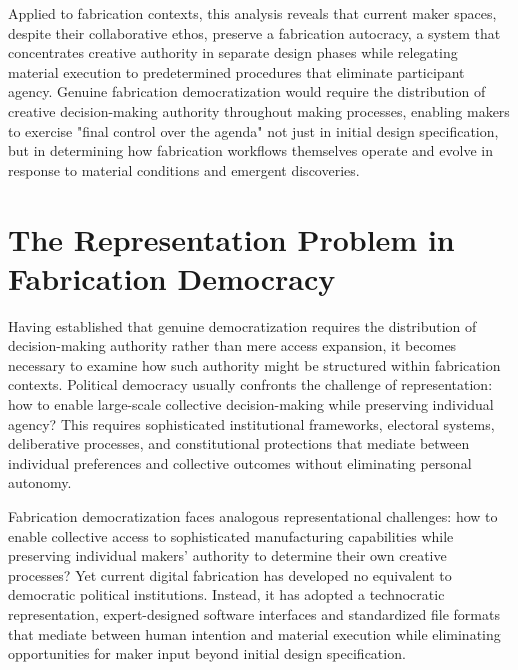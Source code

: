 \vspace{0.5cm}

Applied to fabrication contexts, this analysis reveals that current maker spaces, despite their collaborative ethos, preserve a fabrication autocracy, a system that concentrates creative authority in separate design phases while relegating material execution to predetermined procedures that eliminate participant agency. Genuine fabrication democratization would require the distribution of creative decision-making authority throughout making processes, enabling makers to exercise "final control over the agenda" not just in initial design specification, but in determining how fabrication workflows themselves operate and evolve in response to material conditions and emergent discoveries.

\section{The Representation Problem in Fabrication Democracy}

Having established that genuine democratization requires the distribution of decision-making authority rather than mere access expansion, it becomes necessary to examine how such authority might be structured within fabrication contexts. Political democracy usually confronts the challenge of representation: how to enable large-scale collective decision-making while preserving individual agency? This requires sophisticated institutional frameworks, electoral systems, deliberative processes, and constitutional protections that mediate between individual preferences and collective outcomes without eliminating personal autonomy.

\vspace{0.5cm}

Fabrication democratization faces analogous representational challenges: how to enable collective access to sophisticated manufacturing capabilities while preserving individual makers' authority to determine their own creative processes? Yet current digital fabrication has developed no equivalent to democratic political institutions. Instead, it has adopted  a technocratic representation, expert-designed software interfaces and standardized file formats that mediate between human intention and material execution while eliminating opportunities for maker input beyond initial design specification.

\vspace{0.5cm}

